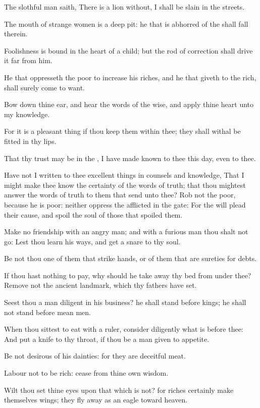 \Verse The slothful man saith, There is a lion without, I shall be slain in the streets.

\Verse The mouth of strange women is a deep pit: he that is abhorred of the \LORD shall fall therein.

\Verse Foolishness is bound in the heart of a child; but the rod of correction shall drive it far from him.

\Verse He that oppresseth the poor to increase his riches, and he that giveth to the rich, shall surely come to want.

\Verse Bow down thine ear, and hear the words of the wise, and apply thine heart unto my knowledge.

\Verse For it is a pleasant thing if thou keep them within thee; they shall withal be fitted in thy lips.

\Verse That thy trust may be in the \LORD, I have made known to thee this day, even to thee.

\Verse Have not I written to thee excellent things in counsels and knowledge, \Verse That I might make thee know the certainty of the words of truth; that thou mightest answer the words of truth to them that send unto thee?  \Verse Rob not the poor, because he is poor: neither oppress the afflicted in the gate: \Verse For the \LORD will plead their cause, and spoil the soul of those that spoiled them.

\Verse Make no friendship with an angry man; and with a furious man thou shalt not go: \Verse Lest thou learn his ways, and get a snare to thy soul.

\Verse Be not thou one of them that strike hands, or of them that are sureties for debts.

\Verse If thou hast nothing to pay, why should he take away thy bed from under thee?  \Verse Remove not the ancient landmark, which thy fathers have set.

\Verse Seest thou a man diligent in his business? he shall stand before kings; he shall not stand before mean men.


\Chapter
\Verse When thou sittest to eat with a ruler, consider diligently what is before thee: \Verse And put a knife to thy throat, if thou be a man given to appetite.

\Verse Be not desirous of his dainties: for they are deceitful meat.

\Verse Labour not to be rich: cease from thine own wisdom.

\Verse Wilt thou set thine eyes upon that which is not? for riches certainly make themselves wings; they fly away as an eagle toward heaven.

